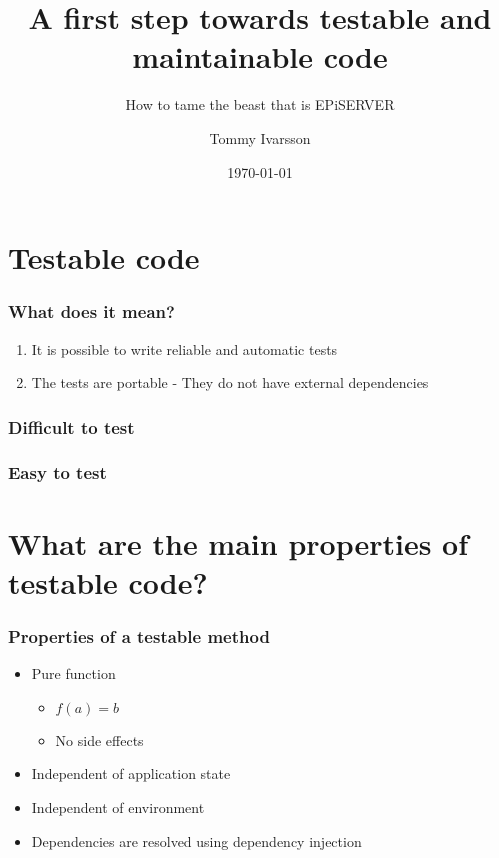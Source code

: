 \documentclass{beamer}
\title{A first step towards testable and maintainable code}
\subtitle{How to tame the beast that is EPiSERVER}
\author{Tommy Ivarsson}
\date{\today}
\begin{document}
	\setcounter{showProgressBar}{0}
	\setcounter{showSlideNumbers}{0}

	\frame{\titlepage}

	\setcounter{framenumber}{0}
	\setcounter{showProgressBar}{1}
	\setcounter{showSlideNumbers}{1}
	\section{Testable code}
		\begin{frame}
			\frametitle{What does it mean?}
			\begin{enumerate}
				\item It is possible to write reliable and automatic tests \pause
				\item The tests are portable - They do not have external dependencies \pause
			\end{enumerate}
		\end{frame}
		\begin{frame}
			\frametitle{Difficult to test}
		\end{frame}
		\begin{frame}
			\frametitle{Easy to test}
		\end{frame}

	\section{What are the main properties of testable code?}
		\begin{frame}
			\frametitle{Properties of a testable method} \pause
			\begin{itemize}
				\item Pure function \pause
				\begin{itemize}
					\item $f(a) = b$ \pause
					\item No side effects \pause
				\end{itemize}
				\item Independent of application state \pause
				\item Independent of environment \pause
				\item Dependencies are resolved using dependency injection
			\end{itemize}
		\end{frame}
\end{document}
